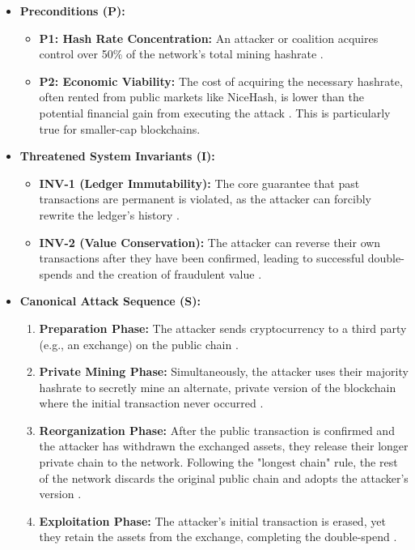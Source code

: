 \begin{itemize}
    \item \textbf{Preconditions (P):}
    \begin{itemize}
        \item \textbf{P1: Hash Rate Concentration:} An attacker or coalition acquires control over 50\% of the network's total mining hashrate \cite{Wang2019, Eyal2014}.
        \item \textbf{P2: Economic Viability:} The cost of acquiring the necessary hashrate, often rented from public markets like NiceHash, is lower than the potential financial gain from executing the attack \cite{Casino2019}. This is particularly true for smaller-cap blockchains.
    \end{itemize}

    \item \textbf{Threatened System Invariants (I):}
    \begin{itemize}
        \item \textbf{INV-1 (Ledger Immutability):} The core guarantee that past transactions are permanent is violated, as the attacker can forcibly rewrite the ledger's history \cite{Wang2019}.
        \item \textbf{INV-2 (Value Conservation):} The attacker can reverse their own transactions after they have been confirmed, leading to successful double-spends and the creation of fraudulent value \cite{Eyal2014}.
    \end{itemize}

    \item \textbf{Canonical Attack Sequence (S):}
    \begin{enumerate}
        \item \textbf{Preparation Phase:} The attacker sends cryptocurrency to a third party (e.g., an exchange) on the public chain \cite{Casino2019}.
        \item \textbf{Private Mining Phase:} Simultaneously, the attacker uses their majority hashrate to secretly mine an alternate, private version of the blockchain where the initial transaction never occurred \cite{Eyal2014}.
        \item \textbf{Reorganization Phase:} After the public transaction is confirmed and the attacker has withdrawn the exchanged assets, they release their longer private chain to the network. Following the "longest chain" rule, the rest of the network discards the original public chain and adopts the attacker's version \cite{Wang2019}.
        \item \textbf{Exploitation Phase:} The attacker's initial transaction is erased, yet they retain the assets from the exchange, completing the double-spend \cite{Casino2019}.
    \end{enumerate}
\end{itemize}

